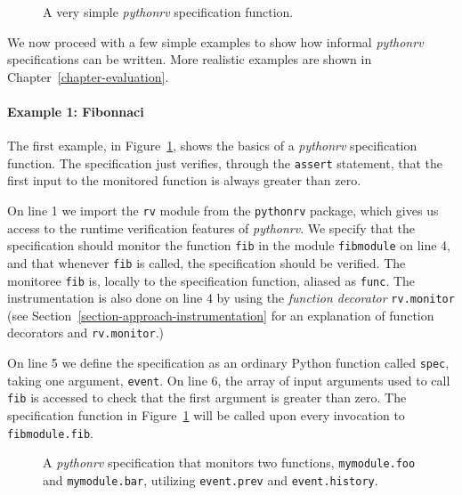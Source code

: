 \begin{figure}[h!]
	\begin{center}
	\begin{minipage}{0.5\textwidth}
	
	\end{minipage}
	\end{center}

  \caption{A very simple \textit{pythonrv} specification function.}
	\label{figure-syntax-example-1}
\end{figure}

We now proceed with a few simple examples to show how informal
\textit{pythonrv} specifications can be written. More realistic examples are
shown in Chapter~\ref{chapter-evaluation}.

\paragraph{Example 1: Fibonnaci}
The first example, in Figure~\ref{figure-syntax-example-1}, shows the basics of
a \textit{pythonrv} specification function. The specification just verifies,
through the \texttt{assert} statement, that the first input to the monitored
function is always greater than zero.

On line 1 we import the \texttt{rv} module from the \texttt{pythonrv} package,
which gives us access to the runtime verification features of
\textit{pythonrv}. We specify that the specification should monitor the
function \texttt{fib} in the module \texttt{fibmodule} on line 4, and that
whenever \texttt{fib} is called, the specification should be verified. The
monitoree \texttt{fib} is, locally to the specification function, aliased as
\texttt{func}. The instrumentation is also done on line 4 by using the
\textit{function decorator} \texttt{rv.monitor} (see
  Section~\ref{section-approach-instrumentation} for an explanation of function
decorators and \texttt{rv.monitor}.)

On line 5 we define the specification as an ordinary Python function called
\texttt{spec}, taking one argument, \texttt{event}. On line 6, the array of
input arguments used to call \texttt{fib} is accessed to check that the first
argument is greater than zero. The specification function in
Figure~\ref{figure-syntax-example-1} will be called upon every invocation to
\texttt{fibmodule.fib}.

\begin{figure}[h!]
	\begin{center}
	\begin{minipage}{0.7\textwidth}
	
	\end{minipage}
	\end{center}

  \caption{A \textit{pythonrv} specification that monitors two functions,
    \texttt{mymodule.foo} and \texttt{mymodule.bar}, utilizing
    \texttt{event.prev} and \texttt{event.history}.}
	\label{figure-syntax-example-2}
\end{figure}

